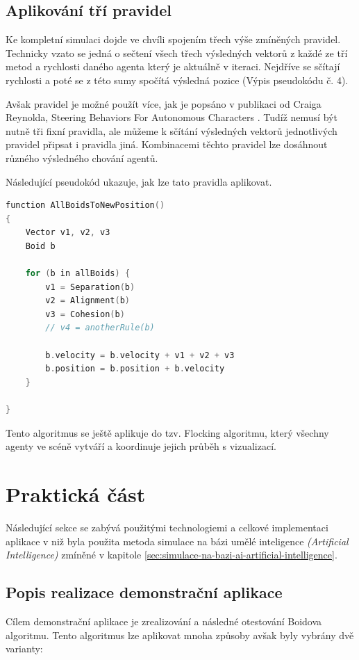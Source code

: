 \documentclass[czech,public,dept460,male,cpdeclaration]{diploma}
\begin{document}
\subsection{Aplikování tří pravidel}\label{sec:aplikovani-tri-pravidel}
Ke kompletní simulaci dojde ve chvíli spojením třech výše zmíněných pravidel. Technicky vzato se jedná o sečtení všech třech výsledných vektorů z každé ze tří metod a rychlosti daného agenta který je aktuálně v iteraci. Nejdříve se sčítají rychlosti a poté se z této sumy spočítá výsledná pozice (Výpis pseudokódu č. 4).

Avšak pravidel je možné použít více, jak je popsáno v publikaci od Craiga Reynolda, Steering Behaviors For Autonomous Characters \cite{linkToSteeringBehaviors}. Tudíž nemusí být nutně tři fixní pravidla, ale můžeme k sčítání výsledných vektorů jednotlivých pravidel připsat i pravidla jiná. Kombinacemi těchto pravidel lze dosáhnout různého výsledného chování agentů.

Následující pseudokód ukazuje, jak lze tato pravidla aplikovat.

\begin{lstlisting}[language=c++,label=src:Flocking pseudocode,caption=Pseudokód pro aplikování třech pravidel (Zdroj: vlastní)]
function AllBoidsToNewPosition()
{
	Vector v1, v2, v3
	Boid b
	
	for (b in allBoids) {
		v1 = Separation(b)
		v2 = Alignment(b)
		v3 = Cohesion(b)
		// v4 = anotherRule(b)
		
		b.velocity = b.velocity + v1 + v2 + v3
		b.position = b.position + b.velocity
	}

}
\end{lstlisting}

Tento algoritmus se ještě aplikuje do tzv. Flocking algoritmu, který všechny agenty ve scéně vytváří a koordinuje jejich průběh s vizualizací.

\newpage
\section{Praktická část}
Následující sekce se zabývá použitými technologiemi a celkové implementaci aplikace v niž byla použita metoda simulace na bázi umělé inteligence \textit{(Artificial Intelligence)} zmíněné v kapitole \ref{sec:simulace-na-bazi-ai-artificial-intelligence}.

\subsection{Popis realizace demonstrační aplikace}
Cílem demonstrační aplikace je zrealizování a následné otestování Boidova algoritmu. Tento algoritmus lze aplikovat mnoha způsoby avšak byly vybrány dvě varianty:
\end{document}
